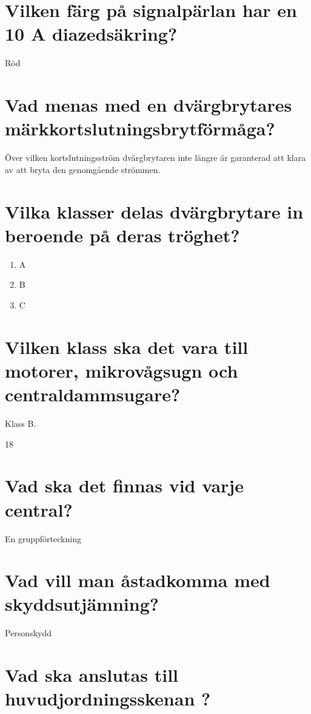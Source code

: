 \documentclass[a4paper,swedish]{article}
\begin{document}
\setcounter{section}{9}
\section{Vilken färg på signalpärlan har en 10 A diazedsäkring?}\label{sec:diazed_10A}

Röd

\setcounter{section}{11}
\section{Vad menas med en dvärgbrytares märkkortslutningsbrytförmåga?}\label{sec:RCD_short_interrupt}

Över vilken kortslutningsström dvärgbrytaren inte längre är garanterad att klara av att bryta
den genomgående strömmen.

\setcounter{section}{13}
\section{Vilka klasser delas dvärgbrytare in beroende på deras tröghet?}\label{sec:RCD_classes}

\begin{enumerate}
\item A
\item B
\item C
\end{enumerate}

\setcounter{section}{15}
\section{Vilken klass ska det vara till motorer, mikrovågsugn och centraldammsugare?}\label{sec:RCD_motordrift}

Klass B.

18\setcounter{section}{17}
\section{Vad ska det finnas vid varje central?}\label{sec:vad_ska_finnas_vid_en_central}

En gruppförteckning

\setcounter{section}{19}
\section{Vad vill man åstadkomma med skyddsutjämning?}\label{sec:skyddsutjamning}
Personskydd


\setcounter{section}{21}
\section{Vad ska anslutas till huvudjordningsskenan ?}\label{sec:huvudjordningsskenan}
\end{document}
